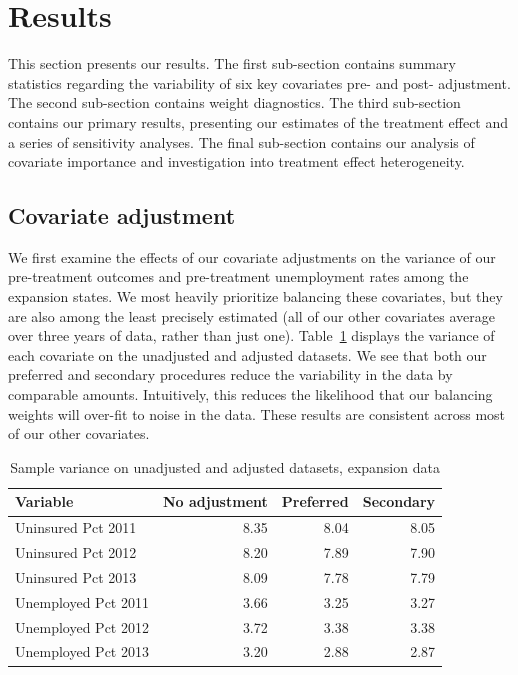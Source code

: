 \section{Results}

This section presents our results. The first sub-section contains summary statistics regarding the variability of six key covariates pre- and post- adjustment. The second sub-section contains weight diagnostics. The third sub-section contains our primary results, presenting our estimates of the treatment effect and a series of sensitivity analyses. The final sub-section contains our analysis of covariate importance and investigation into treatment effect heterogeneity.

\subsection{Covariate adjustment}

We first examine the effects of our covariate adjustments on the variance of our pre-treatment outcomes and pre-treatment unemployment rates among the expansion states. We most heavily prioritize balancing these covariates, but they are also among the least precisely estimated (all of our other covariates average over three years of data, rather than just one). Table~\ref{tab:adjust1} displays the variance of each covariate on the unadjusted and adjusted datasets. We see that both our preferred and secondary procedures reduce the variability in the data by comparable amounts. Intuitively, this reduces the likelihood that our balancing weights will over-fit to noise in the data. These results are consistent across most of our other covariates.

\begin{table}[ht]
\caption{Sample variance on unadjusted and adjusted datasets, expansion data}
\label{tab:adjust1}
\begin{tabular}{lrrr}
  \hline
Variable & No adjustment & Preferred & Secondary \\ 
  \hline
Uninsured Pct 2011 & 8.35 & 8.04 & 8.05 \\ 
  Uninsured Pct 2012 & 8.20 & 7.89 & 7.90 \\ 
  Uninsured Pct 2013 & 8.09 & 7.78 & 7.79 \\ 
  Unemployed Pct 2011 & 3.66 & 3.25 & 3.27 \\ 
  Unemployed Pct 2012 & 3.72 & 3.38 & 3.38 \\ 
  Unemployed Pct 2013 & 3.20 & 2.88 & 2.87 \\ 
   \hline
\end{tabular}
\end{table}

